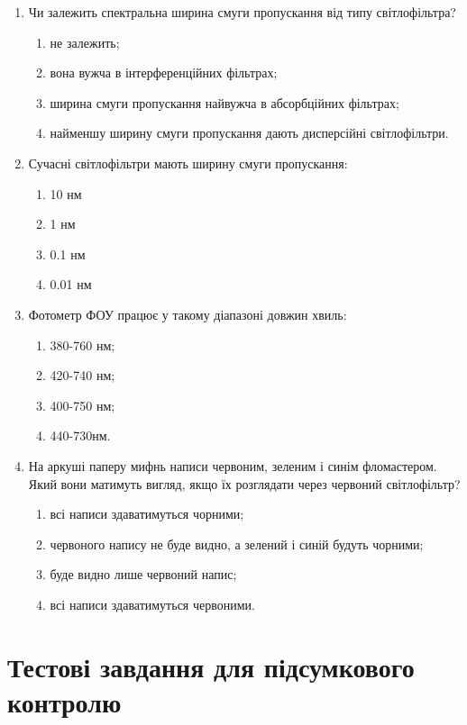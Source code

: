 \documentclass[onecolumn]{el-author}
\begin{document}
\begin{enumerate}
	\item Чи залежить спектральна ширина смуги пропускання від типу світлофільтра?
	\begin{enumerate}
		\item не залежить;
		\item вона вужча в інтерференційних фільтрах;
		\item ширина смуги пропускання найвужча в абсорбційних фільтрах;
		\item найменшу ширину смуги пропускання дають дисперсійні
світлофільтри.
	\end{enumerate}
	\item Сучасні світлофільтри мають ширину смуги пропускання:
	\begin{enumerate}
		\item 10 нм
		\item 1 нм
		\item 0.1 нм
		\item 0.01 нм
	\end{enumerate}
	\item Фотометр ФОУ працює у такому діапазоні довжин хвиль:
	\begin{enumerate}
		\item 380-760 нм;
		\item 420-740 нм;
		\item 400-750 нм; 
		\item 440-730нм.
	\end{enumerate}
	\item На аркуші паперу мифнь написи червоним, зеленим і синім
фломастером. Який вони матимуть вигляд, якщо їх розглядати через
червоний світлофільтр?
	\begin{enumerate}
		\item всі написи здаватимуться чорними;
		\item червоного напису не буде видно, а зелений і синій будуть чорними;
		\item буде видно лише червоний напис;
		\item всі написи здаватимуться червоними.
	\end{enumerate}
\end{enumerate}

\newpage

\section{Тестові завдання для підсумкового контролю}
\end{document}

